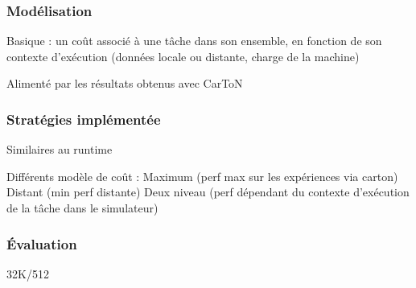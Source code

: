 \documentclass[xcolor={usenames,dvipsnames,svgnames,table}, aspectratio=43]{beamer}
\begin{document}
\begin{frame}
  \frametitle{Modélisation}
  Basique : un coût associé à une tâche dans son ensemble, en fonction de son contexte d'exécution (données locale ou distante, charge de la machine)

  Alimenté par les résultats obtenus avec CarToN

\end{frame}

\begin{frame}
  \frametitle{Stratégies implémentée}
  Similaires au runtime

  Différents modèle de coût :
  Maximum (perf max sur les expériences via carton)
  Distant (min perf distante)
  Deux niveau (perf dépendant du contexte d'exécution de la tâche dans le simulateur)

\end{frame}


\begin{frame}
  \frametitle{Évaluation}
  32K/512
  \begin{figure}
  \end{figure}


\end{frame}
\end{document}
